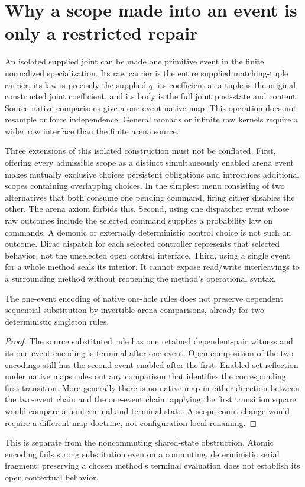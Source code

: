 \documentclass[11pt]{article}
\begin{document}
\section{Why a scope made into an event is only a restricted repair}
An isolated supplied joint can be made one primitive event in the finite normalized specialization. Its raw carrier is the entire supplied matching-tuple carrier, its law is precisely the supplied $q$, its coefficient at a tuple is the original constructed joint coefficient, and its body is the full joint post-state and content. Source native comparisons give a one-event native map. This operation does not resample or force independence. General monads or infinite raw kernels require a wider row interface than the finite arena source.

Three extensions of this isolated construction must not be conflated. First, offering every admissible scope as a distinct simultaneously enabled arena event makes mutually exclusive choices persistent obligations and introduces additional scopes containing overlapping choices. In the simplest menu consisting of two alternatives that both consume one pending command, firing either disables the other. The arena axiom forbids this. Second, using one dispatcher event whose raw outcomes include the selected command supplies a probability law on commands. A demonic or externally deterministic control choice is not such an outcome. Dirac dispatch for each selected controller represents that selected behavior, not the unselected open control interface. Third, using a single event for a whole method seals its interior. It cannot expose read/write interleavings to a surrounding method without reopening the method's operational syntax.

\begin{proposition}
The one-event encoding of native one-hole rules does not preserve dependent sequential substitution by invertible arena comparisons, already for two deterministic singleton rules.
\end{proposition}
\begin{proof}
The source substituted rule has one retained dependent-pair witness and its one-event encoding is terminal after one event. Open composition of the two encodings still has the second event enabled after the first. Enabled-set reflection under native maps rules out any comparison that identifies the corresponding first transition. More generally there is no native map in either direction between the two-event chain and the one-event chain: applying the first transition square would compare a nonterminal and terminal state. A scope-count change would require a different map doctrine, not configuration-local renaming.
\end{proof}
This is separate from the noncommuting shared-state obstruction. Atomic encoding fails strong substitution even on a commuting, deterministic serial fragment; preserving a chosen method's terminal evaluation does not establish its open contextual behavior.
\end{document}
